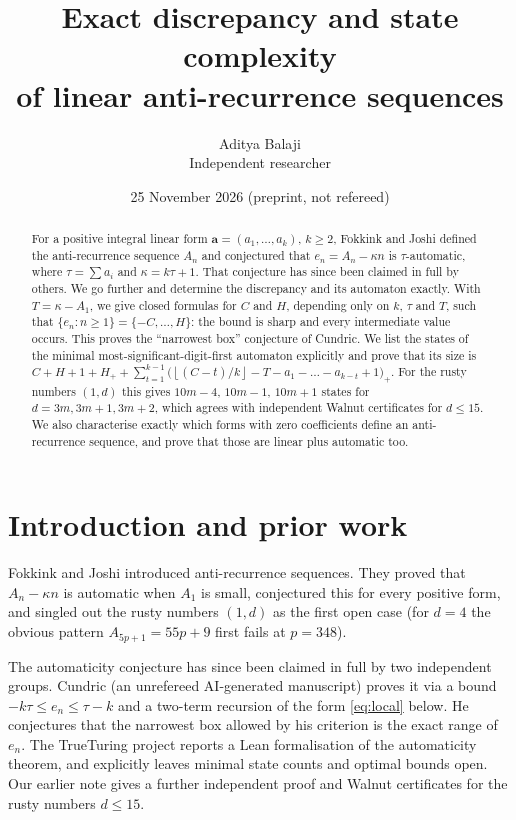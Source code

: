 \documentclass[11pt]{article}
\title{Exact discrepancy and state complexity\\ of linear anti-recurrence sequences}
\author{Aditya Balaji\\ \small Independent researcher}
\date{25 November 2026 \quad (preprint, not refereed)}
\theoremstyle{remark}\newtheorem{remark}[theorem]{Remark}
\theoremstyle{definition}\newtheorem{definition}[theorem]{Definition}
\newcommand{\fl}[1]{\left\lfloor #1\right\rfloor}
\begin{document}
\maketitle
\begin{abstract}
For a positive integral linear form \(\mathbf a=(a_1,\dots,a_k)\), \(k\ge2\), Fokkink and Joshi defined the anti-recurrence sequence \(A_n\) and conjectured that \(e_n=A_n-\kappa n\) is \(\tau\)-automatic, where \(\tau=\sum a_i\) and \(\kappa=k\tau+1\). That conjecture has since been claimed in full by others. We go further and determine the discrepancy and its automaton exactly. With \(T=\kappa-A_1\), we give closed formulas for \(C\) and \(H\), depending only on \(k\), \(\tau\) and \(T\), such that \(\{e_n:n\ge1\}=\{-C,\dots,H\}\): the bound is sharp and every intermediate value occurs. This proves the ``narrowest box'' conjecture of Cundric. We list the states of the minimal most-significant-digit-first automaton explicitly and prove that its size is
\(C+H+1+H_++\sum_{t=1}^{k-1}\bigl(\fl{(C-t)/k}-T-a_1-\dots-a_{k-t}+1\bigr)_+\).
For the rusty numbers \((1,d)\) this gives \(10m-4\), \(10m-1\), \(10m+1\) states for \(d=3m,3m+1,3m+2\), which agrees with independent Walnut certificates for \(d\le15\). We also characterise exactly which forms with zero coefficients define an anti-recurrence sequence, and prove that those are linear plus automatic too.
\end{abstract}

\section{Introduction and prior work}
Fokkink and Joshi \cite{fj} introduced anti-recurrence sequences. They proved that \(A_n-\kappa n\) is automatic when \(A_1\) is small, conjectured this for every positive form, and singled out the rusty numbers \((1,d)\) as the first open case (for \(d=4\) the obvious pattern \(A_{5p+1}=55p+9\) first fails at \(p=348\)).

The automaticity conjecture has since been claimed in full by two independent groups. Cundric \cite{cundric} (an unrefereed AI-generated manuscript) proves it via a bound \(-k\tau\le e_n\le\tau-k\) and a two-term recursion of the form \eqref{eq:local} below. He conjectures that the narrowest box allowed by his criterion is the exact range of \(e_n\). The TrueTuring project \cite{tt} reports a Lean formalisation of the automaticity theorem, and explicitly leaves minimal state counts and optimal bounds open. Our earlier note \cite{ab} gives a further independent proof and Walnut certificates for the rusty numbers \(d\le15\).
\end{document}
